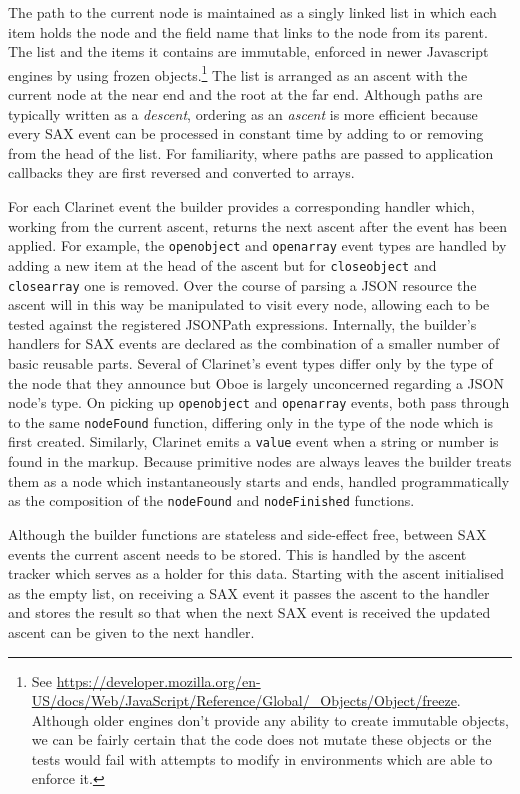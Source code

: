 \documentclass[12pt, ]{article}
\begin{document}
The path to the current node is maintained as a singly linked list in
which each item holds the node and the field name that links to the node
from its parent. The list and the items it contains are immutable,
enforced in newer Javascript engines by using frozen objects.\footnote{See
  \url{https://developer.mozilla.org/en-US/docs/Web/JavaScript/Reference/Global/_Objects/Object/freeze}.
  Although older engines don't provide any ability to create immutable
  objects, we can be fairly certain that the code does not mutate these
  objects or the tests would fail with attempts to modify in
  environments which are able to enforce it.} The list is arranged as an
ascent with the current node at the near end and the root at the far
end. Although paths are typically written as a \emph{descent}, ordering
as an \emph{ascent} is more efficient because every SAX event can be
processed in constant time by adding to or removing from the head of the
list. For familiarity, where paths are passed to application callbacks
they are first reversed and converted to arrays.

For each Clarinet event the builder provides a corresponding handler
which, working from the current ascent, returns the next ascent after
the event has been applied. For example, the \texttt{openobject} and
\texttt{openarray} event types are handled by adding a new item at the
head of the ascent but for \texttt{closeobject} and \texttt{closearray}
one is removed. Over the course of parsing a JSON resource the ascent
will in this way be manipulated to visit every node, allowing each to be
tested against the registered JSONPath expressions. Internally, the
builder's handlers for SAX events are declared as the combination of a
smaller number of basic reusable parts. Several of Clarinet's event
types differ only by the type of the node that they announce but Oboe is
largely unconcerned regarding a JSON node's type. On picking up
\texttt{openobject} and \texttt{openarray} events, both pass through to
the same \texttt{nodeFound} function, differing only in the type of the
node which is first created. Similarly, Clarinet emits a \texttt{value}
event when a string or number is found in the markup. Because primitive
nodes are always leaves the builder treats them as a node which
instantaneously starts and ends, handled programmatically as the
composition of the \texttt{nodeFound} and \texttt{nodeFinished}
functions.

Although the builder functions are stateless and side-effect free,
between SAX events the current ascent needs to be stored. This is
handled by the ascent tracker which serves as a holder for this data.
Starting with the ascent initialised as the empty list, on receiving a
SAX event it passes the ascent to the handler and stores the result so
that when the next SAX event is received the updated ascent can be given
to the next handler.
\end{document}
